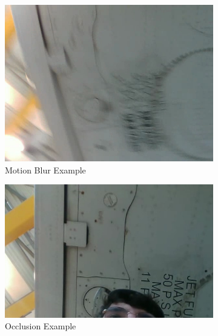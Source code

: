 \documentclass[12pt,oneside]{book} %
\begin{document}
\begin{figure}[H]
    \centering
    \begin{subfigure}[b]{0.3\textwidth}
        \includegraphics[height=0.7\textwidth, width=\textwidth]{figures/image_hard_2.jpg}
        \caption{Motion Blur Example}\label{fig:motion-blur-example}
    \end{subfigure}
    \hfill
    \begin{subfigure}[b]{0.3\textwidth}
        \includegraphics[height=0.7\textwidth, width=\textwidth]{figures/image_hard_4.jpg}
        \caption{Occlusion Example}\label{fig:occlusion-example}
    \end{subfigure}
    \hfill
    \begin{subfigure}[b]{0.3\textwidth}

\end{subfigure}
\end{figure}
\end{document}

